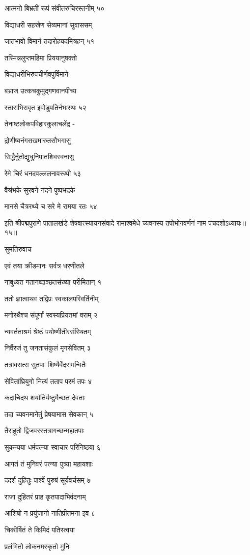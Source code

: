 आत्मनो बिभ्रतीं रूपं संवीतरुचिरस्तनीम् ५०

विद्याधरी सहस्रेण सेव्यमानां सुवाससम्

जातभावो विमानं तदारोहयदमित्रहन् ५१

तस्मिन्नलुप्तमहिमा प्रिययानुषक्तो

विद्याधरीभिरुपचीर्णवपुर्विमाने

बभ्राज उत्कचकुमुद्गणवानपीच्य

स्ताराभिरावृत इवोडुपतिर्नभःस्थः ५२

तेनाष्टलोकपविहारकुलाचलेंद्र -

द्रोणीष्वनंगसखमारुतसौभगासु

सिद्धैर्नुतोद्युधुनिपातशिवस्वनासु

रेमे चिरं धनदवल्ललनावरूथी ५३

वैश्रंभके सुरवने नंदने पुष्पभद्रके

मानसे चैत्ररथ्ये च सरे मे रामया रतः ५४

इति श्रीपद्मपुराणे पातालखंडे शेषवात्स्यायनसंवादे रामाश्वमेधे च्यवनस्य तपोभोगवर्णनं नाम पंचदशोऽध्यायः॥१५॥


सुमतिरुवाच

एवं तया क्रीडमानः सर्वत्र धरणीतले

नाबुध्यत गतानब्दाञ्छतसंख्या परीमितान् १

ततो ज्ञात्वाथव तद्विप्रः स्वकालपरिवर्तिनीम्

मनोरथैश्च संपूर्णां स्वस्यप्रियतमां वराम् २

न्यवर्तताश्रमं श्रेष्ठं पयोष्णीतीरसंस्थितम्

निर्वैरजं तु जनतासंकुलं मृगसेवितम् ३

तत्रावसत्स सुतपाः शिष्यैर्वेदसमन्वितैः

सेवितांघ्रियुगो नित्यं तताप परमं तपः ४

कदाचिदथ शर्यातिर्यष्टुमैच्छत देवताः

तदा च्यवनमानेतुं प्रेषयामास सेवकान् ५

तैराहूतो द्विजवरस्तत्रागच्छन्महातपाः

सुकन्यया धर्मपत्न्या स्वाचार परिनिष्ठया ६

आगतं तं मुनिवरं पत्न्या पुत्र्या महायशाः

ददर्श दुहितुः पार्श्वे पुरुषं सूर्यवर्चसम् ७

राजा दुहितरं प्राह कृतपादाभिवंदनाम्

आशिषो न प्रयुंजानो नातिप्रीतमना इव ८

चिकीर्षितं ते किमिदं पतिस्त्वया

प्रलंभितो लोकनमस्कृतो मुनिः


